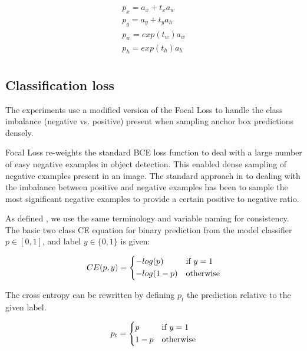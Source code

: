 \begin{equation}
\begin{split}
p_x = a_x + t_x  a_w\\
p_y = a_y + t_y  a_h\\
p_w = exp(t_w) a_w \\
p_h = exp(t_h) a_h\\
\end{split}
\label{eq:decoding_rcnn}
\end{equation}

\subsection {Classification loss}
\label{sec:loss}

The experiments use a modified version of the Focal Loss \cite{Lin2017} to handle the class imbalance (negative vs. positive) present when sampling anchor box predictions densely.

Focal Loss \cite{Lin2017} re-weights the standard \gls{BCE} loss function to deal with a large number of easy negative examples in object detection. This enabled dense sampling of negative examples present in an image. The standard approach in to dealing with the imbalance between positive and negative examples has been to sample the most significant negative examples to provide a certain positive to negative ratio.


As defined \cite{Lin2017}, we use the same terminology and variable naming for consistency. The basic two class \gls{CE} equation for binary prediction from the model classifier $p \in \left[0, 1\right]$, and label $y \in \{0, 1\}$  is given:

\begin{equation}
CE(p, y) = 
  \begin{cases*}
  -log(p) & if $y = 1$\\
  -log(1-p) & otherwise\\
  \end{cases*}
\label{eq:cross_entropy}
\end{equation}


The cross entropy can be rewritten by defining $p_t$ the prediction relative to the given label.

\begin{equation}
p_t = 
  \begin{cases*}
  p & if $y = 1$\\
  1 - p & otherwise\\
  \end{cases*}
\label{eq:class_prob}
\end{equation}

